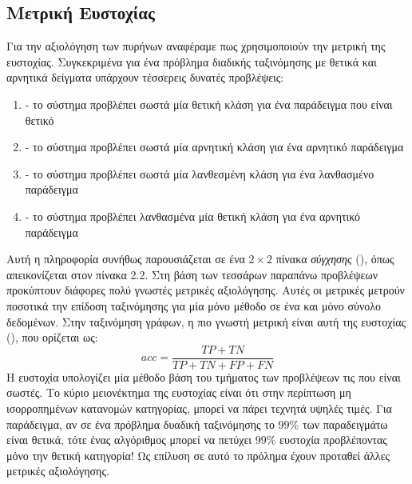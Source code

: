 \subsection{Μετρική Ευστοχίας}
\label{subsection:accuracy}
Για την αξιολόγηση των πυρήνων αναφέραμε πως χρησιμοποιούν την μετρική της ευστοχίας.
Συγκεκριμένα για ένα πρόβλημα διαδικής ταξινόμησης με θετικά και αρνητικά δείγματα υπάρχουν τέσσερεις δυνατές προβλέψεις:
\begin{enumerate}
    \item {} - το σύστημα προβλέπει σωστά μία θετική κλάση για ένα παράδειγμα που είναι θετικό
    \item {} - το σύστημα προβλέπει σωστά μία αρνητική κλάση για ένα αρνητικό παράδειγμα
    \item {} - το σύστημα προβλέπει σωστά μία λανθεσμένη κλάση για ένα λανθασμένο παράδειγμα
    \item {} - το σύστημα προβλέπει λανθασμένα μία θετική κλάση για ένα αρνητικό παράδειγμα
\end{enumerate}
Αυτή η πληροφορία συνήθως παρουσιάζεται σε ένα $2 \times 2$ πίνακα \textit{σύγχησης} (), όπως απεικονίζεται στον πίνακα 2.2.
Στη βάση των τεσσάρων παραπάνω προβλέψεων προκύπτουν διάφορες πολύ γνωστές μετρικές αξιολόγησης.
Αυτές οι μετρικές μετρούν ποσοτικά την επίδοση ταξινόμησης για μία μόνο μέθοδο σε ένα και μόνο σύνολο δεδομένων.
Στην ταξινόμηση γράφων, η πιο γνωστή μετρική είναι αυτή της ευστοχίας (), που ορίζεται ως:
\begin{equation}
    acc = \frac{TP + TN}{TP + TN + FP + FN}    
\end{equation}
Η ευστοχία υπολογίζει μία μέθοδο βάση του τμήματος των προβλέψεων τις που είναι σωστές.
Το κύριο μειονέκτημα της ευστοχίας είναι ότι στην περίπτωση μη ισορροπημένων κατανομών κατηγορίας, μπορεί να πάρει τεχνητά υψηλές τιμές.
Για παράδειγμα, αν σε ένα πρόβλημα δυαδική ταξινόμησης το $99$\% των παραδειγμάτω είναι θετικά, τότε ένας αλγόριθμος μπορεί να πετύχει $99$\% ευστοχία προβλέποντας μόνο την θετική κατηγορία!
Ως επίλυση σε αυτό το πρόλημα έχουν προταθεί άλλες μετρικές αξιολόγησης.

